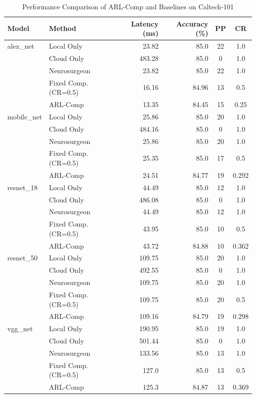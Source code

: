 \begin{table}[htbp]
\centering
\caption{Performance Comparison of ARL-Comp and Baselines on Caltech-101}
\label{tab:comparison}
\begin{tabular}{l|l|r|r|c|c}
\hline
\textbf{Model} & \textbf{Method} & \textbf{Latency (ms)} & \textbf{Accuracy (\%)} & \textbf{PP} & \textbf{CR} \\
\hline\hline
alex_net & Local Only & 23.82 & 85.0 & 22 & 1.0 \\
 & Cloud Only & 483.28 & 85.0 & 0 & 1.0 \\
 & Neurosurgeon & 23.82 & 85.0 & 22 & 1.0 \\
 & Fixed Comp. (CR=0.5) & 16.16 & 84.96 & 13 & 0.5 \\
 & ARL-Comp & 13.35 & 84.45 & 15 & 0.25 \\
\hline
mobile_net & Local Only & 25.86 & 85.0 & 20 & 1.0 \\
 & Cloud Only & 484.16 & 85.0 & 0 & 1.0 \\
 & Neurosurgeon & 25.86 & 85.0 & 20 & 1.0 \\
 & Fixed Comp. (CR=0.5) & 25.35 & 85.0 & 17 & 0.5 \\
 & ARL-Comp & 24.51 & 84.77 & 19 & 0.292 \\
\hline
resnet_18 & Local Only & 44.49 & 85.0 & 12 & 1.0 \\
 & Cloud Only & 486.08 & 85.0 & 0 & 1.0 \\
 & Neurosurgeon & 44.49 & 85.0 & 12 & 1.0 \\
 & Fixed Comp. (CR=0.5) & 43.95 & 85.0 & 10 & 0.5 \\
 & ARL-Comp & 43.72 & 84.88 & 10 & 0.362 \\
\hline
resnet_50 & Local Only & 109.75 & 85.0 & 20 & 1.0 \\
 & Cloud Only & 492.55 & 85.0 & 0 & 1.0 \\
 & Neurosurgeon & 109.75 & 85.0 & 20 & 1.0 \\
 & Fixed Comp. (CR=0.5) & 109.75 & 85.0 & 20 & 0.5 \\
 & ARL-Comp & 109.16 & 84.79 & 19 & 0.298 \\
\hline
vgg_net & Local Only & 190.95 & 85.0 & 19 & 1.0 \\
 & Cloud Only & 501.44 & 85.0 & 0 & 1.0 \\
 & Neurosurgeon & 133.56 & 85.0 & 13 & 1.0 \\
 & Fixed Comp. (CR=0.5) & 127.0 & 85.0 & 13 & 0.5 \\
 & ARL-Comp & 125.3 & 84.87 & 13 & 0.369 \\
\hline
\end{tabular}
\end{table}
